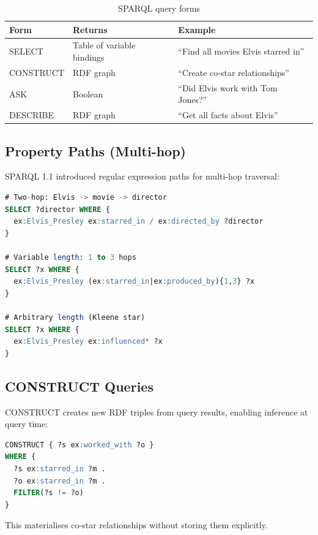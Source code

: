 \documentclass[11pt,a4paper,oneside,openany]{book}
\theoremstyle{definition}
\theoremstyle{plain}
\theoremstyle{remark}
\begin{document}
\begin{table}[h]
	\centering
	\caption{SPARQL query forms}
	\label{tab:sparql-forms}
	\begin{tabular}{lp{4cm}p{5cm}}
		\toprule
		Form      & Returns                    & Example                              \\
		\midrule
		SELECT    & Table of variable bindings & ``Find all movies Elvis starred in'' \\
		CONSTRUCT & RDF graph                  & ``Create co-star relationships''     \\
		ASK       & Boolean                    & ``Did Elvis work with Tom Jones?''   \\
		DESCRIBE  & RDF graph                  & ``Get all facts about Elvis''        \\
		\bottomrule
	\end{tabular}
\end{table}

\subsection{Property Paths (Multi-hop)}

SPARQL 1.1 introduced regular expression paths for multi-hop traversal:

\begin{lstlisting}[language=SQL,numbers=none]
# Two-hop: Elvis -> movie -> director
SELECT ?director WHERE {
  ex:Elvis_Presley ex:starred_in / ex:directed_by ?director
}

# Variable length: 1 to 3 hops
SELECT ?x WHERE {
  ex:Elvis_Presley (ex:starred_in|ex:produced_by){1,3} ?x
}

# Arbitrary length (Kleene star)
SELECT ?x WHERE {
  ex:Elvis_Presley ex:influenced* ?x
}
\end{lstlisting}

\subsection{CONSTRUCT Queries}

CONSTRUCT creates new RDF triples from query results, enabling inference at query time:

\begin{lstlisting}[language=SQL,numbers=none]
CONSTRUCT { ?s ex:worked_with ?o }
WHERE {
  ?s ex:starred_in ?m .
  ?o ex:starred_in ?m .
  FILTER(?s != ?o)
}
\end{lstlisting}

This materialises co-star relationships without storing them explicitly.
\end{document}
